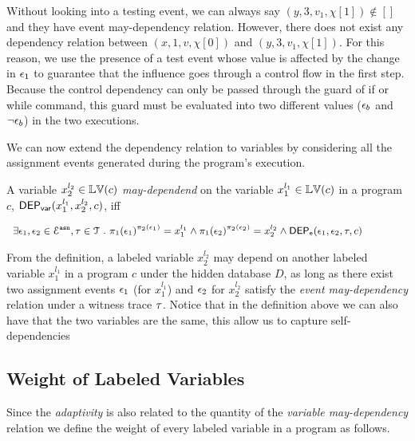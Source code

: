 Without looking into a testing event, we can always say $(y, 3, v_1, \chi[1]) \not\in []$ and they have event may-dependency relation.
However, there does not exist any dependency relation between $(x, 1, v, \chi[0])$ and $(y, 3, v_1, \chi[1])$.
For this reason, we use the presence of a test event whose value is affected by the change in $\mathtt{\epsilon}_1$
to guarantee that the influence goes through a control flow in the first step.
Because the control dependency can only be passed through the guard of if or while command, this guard must be evaluated into two different values ($\mathtt{\epsilon}_b$ and $\neg \mathtt{\epsilon}_b$) in the two executions.


We can now extend the dependency relation to variables by considering all the assignment events generated during the program’s execution. 

\begin{defn}
  \label{def:var_dep}
A variable ${x}_2^{l_2} \in \mathbb{LV}(c)$  \emph{may-dependend} on the 
  variable ${x}_1^{l_1} \in \mathbb{LV}(c)$ in a program ${c}$,
  $\mathsf{DEP_{var}}({x}_1^{l_1}, {x}_2^{l_2}, {c})$, iff
\begin{center}
$
{\small   \begin{array}{l}
\exists \event_1, \event_2 \in \eventset^{\asn}, \trace \in \mathcal{T} \st
\pi_{1}{(\event_1)}^{\pi_{2}{(\event_1)}} = {x}_1^{l_1}
\land
\pi_{1}{(\event_2)}^{\pi_{2}{(\event_2)}} = {x}_2^{l_2}%
\land 
\eventdep(\event_1, \event_2, \trace, c) 
  \end{array}
}%
$
\end{center}
  \end{defn}
{From the definition, a labeled variable $x_2^{l_2}$ may depend on another labeled variable $x_1^{l_1}$ in a program $c$ under the hidden database $D$, 
as long as there exist two assignment events $\mathtt{\epsilon}_1$ (for $x_1^{l_1}$) and $\mathtt{\epsilon}_2$ for $x_2^{l_2}$
satisfy the \emph{event may-dependency} relation under a witness trace $\mathtt{\tau}$.  
Notice that in the definition above we can also have that the two variables are the same,
this allow us to capture self-dependencies
}

\subsection{Weight of Labeled Variables}
\label{sec:dep}
Since the \emph{adaptivity} is also related to the quantity of
the \emph{variable may-dependency} relation
we define 
the weight of
every labeled variable in a program as follows.

